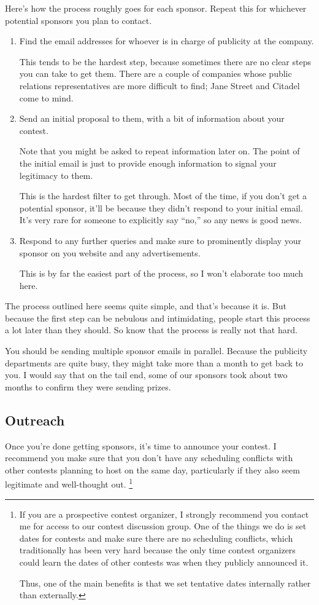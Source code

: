 \documentclass[points=false]{bounce}
\begin{document}
Here's how the process roughly goes for each sponsor. Repeat this for whichever potential sponsors you plan to contact.
\begin{enumerate}
	\item Find the email addresses for whoever is in charge of publicity at the company.
	
	This tends to be the hardest step, because sometimes there are no clear steps you can take to get them. There are a couple of companies whose public relations representatives are more difficult to find; Jane Street and Citadel come to mind.

	\item Send an initial proposal to them, with a bit of information about your contest.

	Note that you might be asked to repeat information later on.
	The point of the initial email is just to provide enough information
	to signal your legitimacy to them.

	This is the hardest filter to get through.
	Most of the time, if you don't get a potential sponsor,
	it'll be because they didn't respond to your initial email.
	It's very rare for someone to explicitly say ``no,''
	so any news is good news.

	\item Respond to any further queries and make sure to prominently display your sponsor on you website and any advertisements.

	This is by far the easiest part of the process, so I won't elaborate too much here.

\end{enumerate}

The process outlined here seems quite simple, and that's because it is.
But because the first step can be nebulous and intimidating,
people start this process a lot later than they should.
So know that the process is really not that hard.

You should be sending multiple sponsor emails in parallel. Because the publicity departments are quite busy, they might take more than a month to get back to you. I would say that on the tail end, some of our sponsors took about two months to confirm they were sending prizes.

\subsection{Outreach}

Once you're done getting sponsors, it's time to announce your contest.
I recommend you make sure that you don't have any scheduling conflicts
with other contests planning to host on the same day,
particularly if they also seem legitimate and well-thought out.
\footnote{If you are a prospective contest organizer,
I strongly recommend you contact me for access to our contest discussion group.
One of the things we do is set dates for contests and make sure there are no scheduling conflicts,
which traditionally has been very hard because the only time contest organizers
could learn the dates of other contests
was when they publicly announced it.

Thus, one of the main benefits is that we set tentative dates internally rather than externally.}
\end{document}
